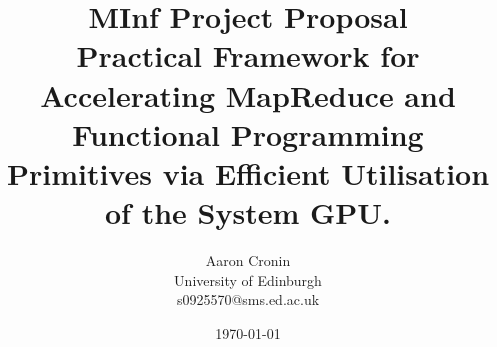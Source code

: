 \begin{titlepage}
  \title{{\small MInf Project Proposal}\\Practical Framework for Accelerating MapReduce and Functional Programming Primitives via Efficient Utilisation of the System GPU.}   %
\author{Aaron Cronin\\University of Edinburgh\\ s0925570@sms.ed.ac.uk}         %

\date{\today}    %
\end{titlepage}

